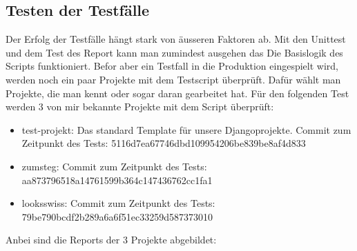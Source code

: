 \subsection{Testen der Testfälle}
Der Erfolg der Testfälle hängt stark von äusseren Faktoren ab. Mit den Unittest und dem Test des Report kann man zumindest ausgehen das Die Basislogik des Scripts funktioniert. 
Befor aber ein Testfall in die Produktion eingespielt wird, werden noch ein paar Projekte mit dem Testscript überprüft. Dafür wählt man Projekte, die man kennt oder sogar daran gearbeitet hat. 
Für den folgenden Test werden 3 von mir bekannte Projekte mit dem Script überprüft:
\begin{itemize}
    \item test-projekt: Das standard Template für unsere Djangoprojekte. Commit zum Zeitpunkt des Tests: 5116d7ea67746dbd109954206be839be8af4d833 
    \item zumsteg: Commit zum Zeitpunkt des Tests: aa873796518a14761599b364c147436762cc1fa1  
    \item looksswiss: Commit zum Zeitpunkt des Tests: 79be790bcdf2b289a6a6f51ec33259d587373010 
\end{itemize}
 
Anbei sind die Reports der 3 Projekte abgebildet:

